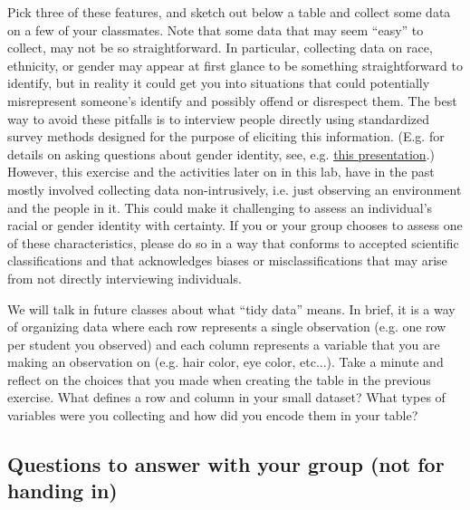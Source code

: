 \documentclass{article}\usepackage[]{graphicx}\usepackage[]{color}
\begin{document}
\bigskip

\begin{exercise}
Pick three of these features, and sketch out below a table and collect some data on a few of your classmates. Note that some data that may seem ``easy'' to collect, may not be so straightforward. In particular, collecting data on race, ethnicity, or gender may appear at first glance to be something straightforward to identify, but in reality it could get you into situations that could potentially misrepresent someone's identify and possibly offend or disrespect them. The best way to avoid these pitfalls is to interview people directly using standardized survey methods designed for the purpose of eliciting this information. (E.g. for details on asking questions about gender identity, see, e.g. \href{https://williamsinstitute.law.ucla.edu/wp-content/uploads/June-22-Gender-identity-presentation.pdf}{this presentation}.) However, this exercise and the activities later on in this lab, have in the past mostly involved collecting data non-intrusively, i.e. just observing an environment and the people in it. This could make it challenging to assess an individual's racial or gender identity with certainty. If you or your group chooses to assess one of these characteristics, please do so in a way that conforms to accepted scientific classifications and that acknowledges biases or misclassifications that may arise from not directly interviewing individuals.
\end{exercise}

\clearpage

\begin{exercise}
We will talk in future classes about what ``tidy data'' means. In brief, it is a way of organizing data where each row represents a single observation (e.g. one row per student you observed) and each column represents a variable that you are making an observation on (e.g. hair color, eye color, etc...). Take a minute and reflect on the choices that you made when creating the table in the previous exercise. What defines a row and column in your small dataset? What types of variables were you collecting and how did you encode them in your table?
\end{exercise}

\vspace{5em}

\subsection*{Questions to answer with your group (not for handing in)}
\end{document}
